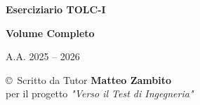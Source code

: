 \documentclass[20pt, a4paper]{article}
\begin{document}
\begin{titlepage}
    \centering
    \vspace*{2cm}
    {\Huge \textbf{Eserciziario TOLC-I} \par}
    \vspace{1cm}
    {\Large \textbf{Volume Completo} \par}
    \vspace{4cm}
    {\Large A.A. 2025 -- 2026 \par}
    \vspace{4cm}
    \vfill
    {\large \copyright \ Scritto da Tutor \textbf{Matteo Zambito} \\
    per il progetto \textit{"Verso il Test di Ingegneria"} \par}
\end{titlepage}

\newpage
\tableofcontents
\newpage
\end{document}
